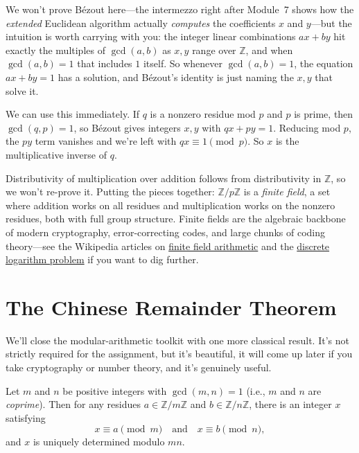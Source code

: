 \documentclass[11pt]{article}
\begin{document}
\noindent We won't prove B\'ezout here---the intermezzo right after Module~7 shows how the \emph{extended} Euclidean algorithm actually \emph{computes} the coefficients $x$ and $y$---but the intuition is worth carrying with you: the integer linear combinations $ax + by$ hit exactly the multiples of $\gcd(a,b)$ as $x, y$ range over $\mathbb{Z}$, and when $\gcd(a,b) = 1$ that includes $1$ itself. So whenever $\gcd(a,b) = 1$, the equation $ax + by = 1$ has a solution, and B\'ezout's identity is just naming the $x, y$ that solve it.

We can use this immediately. If $q$ is a nonzero residue mod $p$ and $p$ is prime, then $\gcd(q, p) = 1$, so B\'ezout gives integers $x, y$ with $qx + py = 1$. Reducing mod $p$, the $py$ term vanishes and we're left with $qx \equiv 1 \pmod p$. So $x$ is the multiplicative inverse of $q$.

Distributivity of multiplication over addition follows from distributivity in $\mathbb{Z}$, so we won't re-prove it. Putting the pieces together: $\mathbb{Z}/p\mathbb{Z}$ is a \emph{finite field}, a set where addition works on all residues and multiplication works on the nonzero residues, both with full group structure. Finite fields are the algebraic backbone of modern cryptography, error-correcting codes, and large chunks of coding theory---see the Wikipedia articles on \href{https://en.wikipedia.org/wiki/Finite_field_arithmetic}{finite field arithmetic} and the \href{https://en.wikipedia.org/wiki/Finite_field#Discrete_logarithm}{discrete logarithm problem} if you want to dig further.

\section{The Chinese Remainder Theorem}

We'll close the modular-arithmetic toolkit with one more classical result. It's not strictly required for the assignment, but it's beautiful, it will come up later if you take cryptography or number theory, and it's genuinely useful.

\begin{theorem}
Let $m$ and $n$ be positive integers with $\gcd(m, n) = 1$ (i.e., $m$ and $n$ are \emph{coprime}). Then for any residues $a \in \mathbb{Z}/m\mathbb{Z}$ and $b \in \mathbb{Z}/n\mathbb{Z}$, there is an integer $x$ satisfying
\[
  x \equiv a \pmod m \quad \text{and} \quad x \equiv b \pmod n,
\]
and $x$ is uniquely determined modulo $mn$.
\end{theorem}
\end{document}
